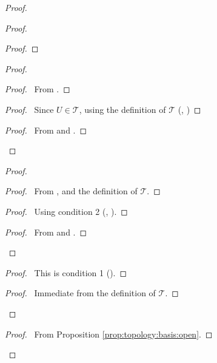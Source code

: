 \documentclass{report}
\let\qed\relax
\theoremstyle{definition}
\begin{document}
\begin{proof}
\begin{proof}
\begin{proof}
      \end{proof}
      \begin{proof}
        \begin{proof}
          \pf\ From .
        \end{proof}
        \begin{proof}
          \pf\ Since $U \in \mathcal{T}$, using the definition of $\mathcal{T}$
          (, )
        \end{proof}
        \begin{proof}
          \pf\ From  and .
        \end{proof}
      \end{proof}
      \begin{proof}
        \begin{proof}
          \pf\ From ,  and the definition of
          $\mathcal{T}$.
        \end{proof}
        \begin{proof}
          \pf\ Using condition 2 (, ).
        \end{proof}
        \begin{proof}
          \pf\ From  and .
        \end{proof}
      \end{proof}
      \begin{proof}
        \pf\ This is condition 1 ().
      \end{proof}
      \begin{proof}
        \pf\ Immediate from the definition of $\mathcal{T}$.
      \end{proof}
    \end{proof}
    \begin{proof}
      \pf\ From Proposition \ref{prop:topology:basis:open}.
    \end{proof}
    \qed
  \end{proof}
\end{document}
